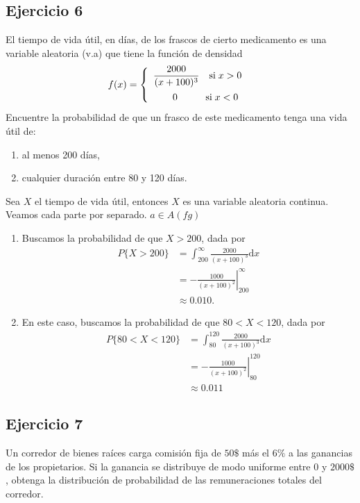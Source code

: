 \subsection*{Ejercicio 6}
	El tiempo de vida útil, en días, de los frascos de cierto medicamento es una variable aleatoria (v.a) que
	tiene la función de densidad
	\[ 
	f(x) = \begin{cases}
			\hspace{.5em} \dfrac{2000}{(x+100)^3}  \quad \text{si} \; x > 0 \\[.8em]
			\hspace{2.5em} 0 \hspace{2.9em} \text{si} \; x < 0
		   \end{cases}
	\]
	Encuentre la probabilidad de que un frasco de este medicamento tenga una vida útil de:
	\begin{enumerate}
		\item al menos 200 días,
		\item cualquier duración entre 80 y 120 días.
	\end{enumerate}

\begin{sol}
	Sea $X$ el tiempo de vida útil, entonces $X$ es una variable aleatoria continua. Veamos cada parte por separado. $a\in A (fg)$
	\begin{enumerate}
		\item Buscamos la probabilidad de que $X>200$, dada por
		\begin{align*}
			P\{X>200\} &= \int_{200}^{\infty} \frac{2000}{(x+100)^3} \mathrm{d}x \\
			&= \left. -\frac{1000}{(x+100)^2} \right\rvert^\infty_{200} \\
			&\approx 0.010.
		\end{align*}
		\item En este caso, buscamos la probabilidad de que $80<X<120$, dada por
		\begin{align*}
			P\{80<X<120\} &= \int_{80}^{120} \frac{2000}{(x+100)^3} \mathrm{d}x \\
			&= \left. -\frac{1000}{(x+100)^2} \right\rvert^{120}_{80} \\
			&\approx 0.011
		\end{align*}
	\end{enumerate}
\end{sol}
\subsection*{Ejercicio 7}
	Un corredor de bienes raíces carga comisión fija de $50\$$ más el $6\%$ a las ganancias de los propietarios.
	Si la ganancia se distribuye de modo uniforme entre 0 y $2000\$$, obtenga la distribución de probabilidad de las
	remuneraciones totales del corredor.

